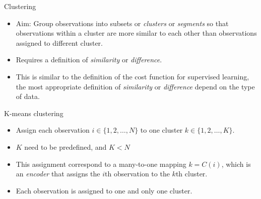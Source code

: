 \documentclass[notes]{beamer}          %
\begin{document}
\begin{frame}{Clustering}
\begin{itemize}

\item Aim: Group observations into subsets or \textit{clusters} or \textit{segments} so that observations within a cluster are more similar to each other than observations assigned to different cluster.
\item Requires a definition of \textit{similarity} or \textit{difference}.
\item This is similar to the definition of the cost function for supervised learning, the most appropriate definition of \textit{similarity} or \textit{difference} depend on the type of data.

\end{itemize}

\end{frame}

\begin{frame}{K-means clustering}
\begin{itemize}

\item Assign each observation $i \in \{1, 2, \dots, N \}$ to one cluster $k \in \{1, 2, \dots, K \}$.
\item $K$ need to be predefined, and $K < N$
\item This assignment correspond to a many-to-one mapping $k = C(i)$, which is an \textit{encoder} that assigns the $i$th observation to the $k$th cluster.
\item Each observation is assigned to one and only one cluster.

\end{itemize}

\end{frame}
\end{document}
